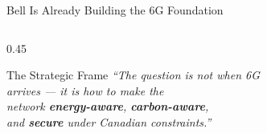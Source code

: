 \documentclass[aspectratio=169, 11pt]{beamer}
\begin{document}
\begin{frame}{Bell Is Already Building the 6G Foundation}
\begin{columns}[T]
\begin{column}{0.45\textwidth}
  \vspace{4pt}
  \begin{exampleblock}{The Strategic Frame}
    \centering
    \textit{``The question is not when 6G\\arrives — it is how to make the\\ network \textbf{energy-aware}, \textbf{carbon-aware},\\and \textbf{secure} under Canadian constraints.''}
  \end{exampleblock}

\end{column}
\end{columns}

\end{frame}

\end{document}
